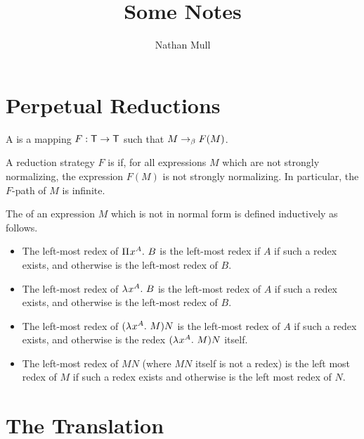 \documentclass{article}
\title{Some Notes}
\author{Nathan Mull}
\begin{document}
\maketitle


\section{Perpetual Reductions}

\begin{definition}
A  is a mapping $F : \mathsf{T} \to \mathsf{T}$ such that $M \rightarrow_\beta F(M)$.
\end{definition}



\begin{definition}
A reduction strategy $F$ is  if, for all expressions $M$ which are not strongly normalizing, the expression $F(M)$ is not strongly normalizing.
In particular, the $F$-path of $M$ is infinite.
\end{definition}

\begin{definition}
  The  of an expression $M$ which is not in normal form is defined inductively as follows.
  \begin{itemize}
    \item The left-most redex of ${\Pi^{} {x}^{A}. \ {B}}$ is the left-most redex if $A$ if such a redex exists, and otherwise is the left-most redex of $B$.
    \item The left-most redex of $\lambda^{} x^{A}. \ B$ is the left-most redex of $A$ if such a redex exists, and otherwise is the left-most redex of $B$.
    \item The left-most redex of $(\lambda^{} x^{A}. \ M) N$ is the left-most redex of $A$ if such a redex exists, and otherwise is the redex $(\lambda^{} x^{A}. \ M) N$ itself.
    \item The left-most redex of $M N$ (where $MN$ itself is not a redex) is the left most redex of $M$ if such a redex exists and otherwise is the left most redex of $N$.
  \end{itemize}
\end{definition}





\section{The Translation}
\end{document}
